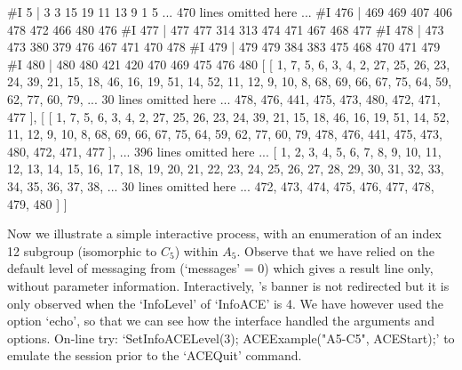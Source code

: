 #I       5 |      3      3     15     19     11     13      9      1      5
... 470 lines omitted here ...
#I     476 |    469    469    407    406    478    472    466    480    476
#I     477 |    477    477    314    313    474    471    467    468    477
#I     478 |    473    473    380    379    476    467    471    470    478
#I     479 |    479    479    384    383    475    468    470    471    479
#I     480 |    480    480    421    420    470    469    475    476    480
[ [ 1, 7, 5, 6, 3, 4, 2, 27, 25, 26, 23, 24, 39, 21, 15, 18, 46, 16, 19, 51, 
      14, 52, 11, 12, 9, 10, 8, 68, 69, 66, 67, 75, 64, 59, 62, 77, 60, 79, 
... 30 lines omitted here ...
      478, 476, 441, 475, 473, 480, 472, 471, 477 ],
[ [ 1, 7, 5, 6, 3, 4, 2, 27, 25, 26, 23, 24, 39, 21, 15, 18, 46, 16, 19, 51, 
      14, 52, 11, 12, 9, 10, 8, 68, 69, 66, 67, 75, 64, 59, 62, 77, 60, 79, 
      478, 476, 441, 475, 473, 480, 472, 471, 477 ], 
... 396 lines omitted here ...
  [ 1, 2, 3, 4, 5, 6, 7, 8, 9, 10, 11, 12, 13, 14, 15, 16, 17, 18, 19, 20, 
      21, 22, 23, 24, 25, 26, 27, 28, 29, 30, 31, 32, 33, 34, 35, 36, 37, 38, 
... 30 lines omitted here ...
      472, 473, 474, 475, 476, 477, 478, 479, 480 ] ]
\endexample


Now we illustrate a simple interactive process, with an enumeration of
an index 12 subgroup (isomorphic to $C_5$) within $A_5$. Observe  that
we  have  relied  on  the  default  level  of  messaging  from  {\ACE}
(`messages' = 0) which gives a result  line  only,  without  parameter
information. Interactively, {\ACE}'s banner is not redirected  but  it
is only observed when the `InfoLevel'  of  `InfoACE'  is  4.  We  have
however used the option `echo', so that we can see how  the  interface
handled the arguments and options. On-line  try:  `SetInfoACELevel(3);
ACEExample("A5-C5", ACEStart);' to emulate the session  prior  to  the
`ACEQuit' command.

